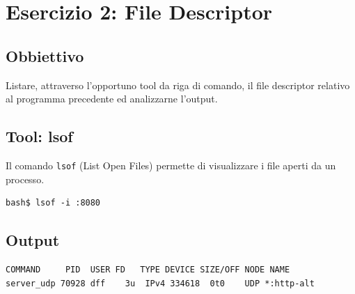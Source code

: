 \documentclass[a4paper,12pt]{article}
\begin{document}
\section{Esercizio 2: File Descriptor}

\subsection{Obbiettivo}
Listare, attraverso l'opportuno tool da riga di comando, il file descriptor
relativo al programma precedente ed analizzarne l'output.

\subsection{Tool: lsof}
Il comando \texttt{lsof} (List Open Files) permette di visualizzare i file aperti da un processo.
\begin{lstlisting}[caption={Comando lsof}]
bash$ lsof -i :8080
\end{lstlisting}
\FloatBarrier

\newpage
\subsection{Output}
\begin{lstlisting}[caption={Output lsof}]
COMMAND     PID  USER FD   TYPE DEVICE SIZE/OFF NODE NAME
server_udp 70928 dff    3u  IPv4 334618  0t0    UDP *:http-alt
\end{lstlisting}
\FloatBarrier
\end{document}

